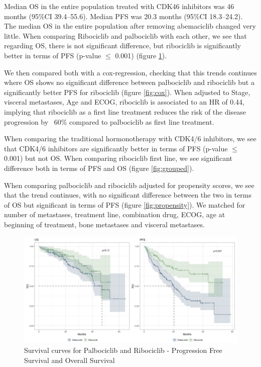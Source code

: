 Median OS in the entire population treated with  CDK4\/6 inhibitors was 46 months (95\%CI 39.4–55.6). Median PFS  was 20.3 months (95\%CI 18.3–24.2). The median OS in the entire population after removing abemaciclib changed very little.
When comparing Ribociclib and palbociclib with each other, we see that regarding OS, there is not significant difference, but ribociclib is significantly better in terms of PFS (p-value $\le$ 0.001) (figure \ref*{fig:interest}).

We then compared both with a cox-regression, checking that this trends continues where OS shows no significant difference between palbociclib and ribociclib but a significantly better PFS for ribociclib (figure \ref*{fig:cox}). When adjusted to Stage, visceral metastases, Age and ECOG, ribociclib is associated to an HR of 0.44, implying that ribociclib as a first line treatment reduces the risk of the disease progression by ~60\% compared to palbociclib as first line treatment.

When comparing the traditional hormonotherapy with CDK4/6 inhibitors, we see that CDK4/6 inhibitors are significantly better in terms of PFS (p-value $\le$ 0.001) but not OS. When comparing ribociclib first line, we see significant difference both in terms of PFS and OS
(figure \ref*{fig:grouped}).

When comparing palbociclib and ribociclib adjusted for propensity scores, we see that the trend continues, with no significant difference between the two in terms of OS but significant in terms of PFS (figure \ref*{fig:propensity}). We matched for number of metastases, treatment line, combination drug, ECOG, age at beginning of treatment, bone metastases and visceral metastases.

\begin{figure}[ht]
  \caption{Survival curves for Palbociclib and Ribociclib - Progression Free Survival and Overall Survival}\label{fig:interest} 
  \includegraphics[scale=0.4]{figures/interest_curve_both.jpeg}%

\end{figure}


